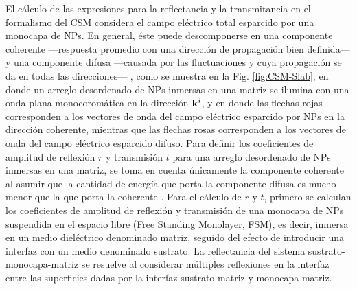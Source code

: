     El cálculo de las expresiones para la reflectancia y la transmitancia en el formalismo del CSM considera el campo eléctrico total esparcido por una monocapa de NPs. En general, éste puede descomponerse en una componente coherente ---respuesta promedio con una dirección de propagación bien definida--- y una componente difusa ---causada por las fluctuaciones y cuya propagación se da en todas las direcciones--- \cite{tsang2000scattering}, como se muestra en la Fig. \ref{fig:CSM-Slab}, en donde un arreglo desordenado de NPs inmersas en una matriz se ilumina con una onda plana monocoromática en la dirección $\vb{k}^i$, y en donde las flechas rojas corresponden a los vectores de onda del campo eléctrico esparcido por NPs en la dirección coherente, mientras que las flechas rosas corresponden a los vectores de onda del campo eléctrico esparcido difuso. Para definir los coeficientes de amplitud de reflexión $r$ y transmisión $t$ para una arreglo desordenado de NPs inmersas en una matriz, se toma en cuenta  únicamente la componente coherente al asumir que la cantidad de energía que porta la componente difusa es mucho menor que la que porta la coherente \cite{reyes2018analytical}. Para el cálculo de $r$ y $t$, primero se calculan los coeficientes de amplitud de reflexión y transmisión de una monocapa de NPs suspendida en el espacio libre (Free Standing Monolayer, FSM), es decir, inmersa en un medio dieléctrico denominado matriz, seguido del efecto de introducir una interfaz con un medio denominado sustrato. La reflectancia del sistema sustrato-monocapa-matriz se resuelve al considerar  múltiples reflexiones en la interfaz entre las superficies dadas por la interfaz sustrato-matriz y monocapa-matriz. 
 
